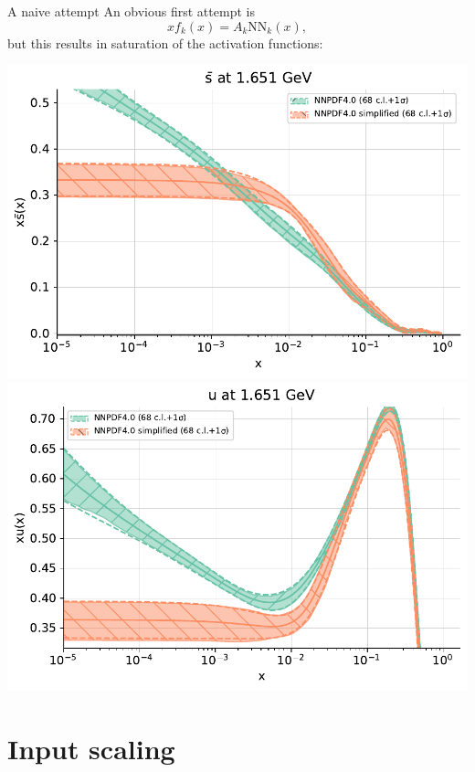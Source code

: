 \documentclass[aspectratio=169,11pt]{beamer}
\newcommand{\nn}{\vspace*{1em}}
\begin{document}
\begin{frame}[t]{A naive attempt}
  An obvious first attempt is $$ xf_k(x) = A_k \mathrm{NN}_k(x), $$ but this results in saturation of the activation functions:
  \begin{center}
    \includegraphics[height=0.55\textheight]{pdf_sbar_log_saturated.pdf} 
    \includegraphics[height=0.55\textheight]{pdf_u_log_saturated.pdf}
  \end{center}
\end{frame}


\section{Input scaling}
\end{document}
